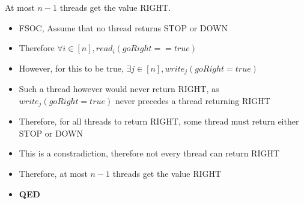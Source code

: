 \documentclass[]{article}
\begin{document}
At most $n - 1$ threads get the value RIGHT.
\begin{itemize}
	\item FSOC, Assume that no thread returns STOP or DOWN
	\item Therefore $\forall i \in [n], read_i(goRight == true)$
	\item However, for this to be true, $\exists j \in [n], write_j(goRight = true)$
	\item Such a thread however would never return RIGHT, as $write_j(goRight = true)$ never precedes a thread returning RIGHT
	\item Therefore, for all threads to return RIGHT, some thread must return either STOP or DOWN
	\item This is a constradiction, therefore not every thread can return RIGHT
	\item Therefore, at most $n - 1$ threads get the value RIGHT
	\item \textbf{QED}
\end{itemize}
\end{document}
